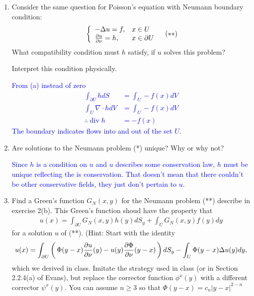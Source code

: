 \documentclass[10pt,a4paper]{report}
\newcommand{\BLUE}[1]{\textcolor{blue}{#1}}
\begin{document}
\begin{description}
\begin{enumerate}[label=\arabic*]
\begin{enumerate}[label=(\alph*)]
			Interpret the condtion $\int _{\partial U} h\, dS = 0$ physically.
			
			\BLUE{\begin{align*}
				\int_U \Delta u\; dV &= \int_U \nabla \cdot Du dV \\
				&= \int_{\partial U} \; Du dS \\
				&= \int_{\partial U} \PART{u}{\nu} dS \\
				&= \int_{\partial U} h dS \\
				&= 0
			\end{align*}The intergral over a closed boundary is zero implies that $h$ represents a conservative vector field.
			}
			
		\item Consider the same question for Poisson's equation with Neumann boundary condition:
		\begin{align*}
			&\left \{ \begin{array}{ll} -\Delta u = f, & x \in U\\ \frac{\partial u}{\partial \nu}=h, & x \in \partial U \end{array} \right . & (**)
		\end{align*}What compatibility  condition must $h$ satisfy, if $u$ solves this problem?
		
		Interpret this condition physically.
		
		\BLUE{From (a) instead of zero 
		\begin{align*}
			 \int_{\partial U} h dS &=  \int_U -f(x) dV \\
			 \int_U \nabla \cdot h dV &= \int_U -f(x) dV \\
			 \therefore \operatorname{div} h &= -f(x)
		\end{align*}The boundary indicates flows into and out of the set $U$.
		}
		
		\item Are solutions to the Neumann problem (*) unique?  Why or why not?
		
		\BLUE{Since $h$ is a condition on $u$ and $u$ describes some conservation law, $h$ must be unique reflecting the is conservation.  That doesn't mean that there couldn't be other conservative fields, they just don't pertain to $u$.
		}
		
		\item Find a Green's function $G_N(x,y)$ for the Neumann problem (**) describe in exercise 2(b).  This Green's function shoud have the property that 
		\begin{align*}
			u(x) = \int_{\partial U} G_N(x,y)h(y)dS_y + \int_U G_N(x,y)f(y)dy
		\end{align*} for a solution $u$ of (**).
		(Hint: Start with the identity
		\begin{align*}
			u(x) =\int_{\partial U} \left (\, \Phi(y-x)\frac{\partial u}{\partial \nu}(y) - u(y)\frac{\partial \Phi}{\partial \nu}(y-x) \,\right ) dS_y - \int_U \Phi(y-x)\Delta u(y) dy,
		\end{align*}which we derived in class.  Imitate the strategy used in class (or in Section 2.2.4(a) of Evans), but replace the corrector function $\phi^x(y)$ with a different corrector $\psi^x(y)$. You can assume $n\ge 3$ so that $\Phi(y-x)=c_n|y-x|^{2-n}$
		

\end{enumerate}
\end{enumerate}
\end{description}
\end{document}
